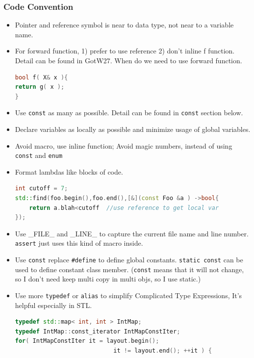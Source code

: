 \documentclass[a4paper,12pt,twoside]{book}
\begin{document}
\subsubsection{Code Convention}
\begin{itemize}

\item Pointer and reference symbol is near to data type, not near to a variable name.



\item For forward function, 1) prefer to use reference 2) don't inline f function. Detail can be found in GotW27. When do we need to use forward function.

\begin{lstlisting}[frame=single, language=c++]
bool f( X& x ){
return g( x );
}
\end{lstlisting}

\item Use \texttt{const} as many as possible. Detail can be found in \texttt{const} section below. 

\item Declare variables as locally as possible and minimize usage of global variables.

\item Avoid macro, use inline function;  Avoid magic numbers, instead of using \texttt{const} and \texttt{enum}

\item Format lambdas like blocks of code.
\begin{lstlisting}[frame=single, language=c++]
int cutoff = 7;
std::find(foo.begin(),foo.end(),[&](const Foo &a ) ->bool{
    return a.blah<cutoff  //use reference to get local var
});
\end{lstlisting}


\item Use \_FILE\_ and \_LINE\_ to capture the current file name and line number.  \texttt{assert} just uses this kind of macro inside.

\item Use \texttt{const} replace \texttt{\#define} to define global constants. \texttt{static const} can be used to define constant class member. (\texttt{const} means that it will not change, so I don't need keep multi copy in multi objs, so I use static.)

\item Use more \texttt{typedef} or \texttt{alias} to simplify Complicated Type Expressions, It's helpful especially in STL. 
 \begin{lstlisting}[frame=single, language=c++]
typedef std::map< int, int > IntMap;
typedef IntMap::const_iterator IntMapConstIter;
for( IntMapConstIter it = layout.begin();
                            it != layout.end(); ++it ) {


\end{lstlisting}
\end{itemize}
\end{document}
